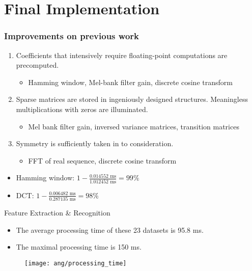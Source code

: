\section{Final Implementation}


\begin{frame}
\frametitle{Improvements on previous work}
\begin{enumerate}
	\item Coefficients that intensively require floating-point computations are precomputed.
	\begin{itemize}
		\item Hamming window, Mel-bank filter gain, discrete cosine transform
	\end{itemize}
	\item Sparse matrices are stored in ingeniously designed structures. Meaningless multiplications with zeros are illuminated.
	\begin{itemize}
		\item Mel bank filter gain, inversed variance matrices, transition matrices
	\end{itemize}
	\item Symmetry is sufficiently taken in to consideration.
	\begin{itemize}
		\item FFT of real sequence, discrete cosine transform
	\end{itemize}
\end{enumerate}

\begin{itemize}
\item Hamming window: $1 - \frac{0.014552 \text{ ms}}{1.012452 \text{ ms}} = 99\%$
\item DCT: $1 - \frac{0.006482 \text{ ms}}{0.287135 \text{ ms}} = 98\%$
\end{itemize}
\end{frame}


\begin{frame}
Feature Extraction \& Recognition
\begin{itemize}
\item The average processing time of these 23 datasets is 95.8 ms.
\item The maximal processing time is 150 ms.
\end{itemize}

\begin{figure}[H]
\centering
\texttt{[image: ang/processing\_time]}
\end{figure}
\end{frame}


